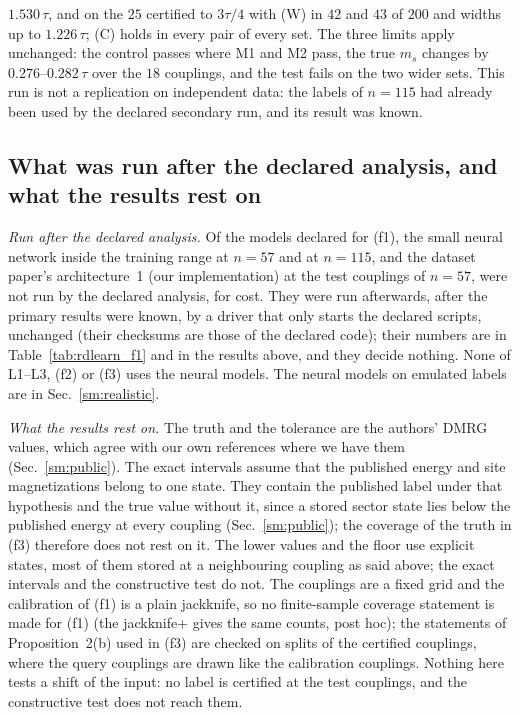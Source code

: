 \documentclass[aps,prx,onecolumn,10pt,nofootinbib,longbibliography,floatfix]{revtex4-2}
\theoremstyle{remark}
\newcommand{\ms}{m_s}
\begin{document}
$1.530\,\tau$, and on the $25$ certified to $3\tau/4$ with (W) in $42$ and $43$ of $200$ and widths up to %
$1.226\,\tau$; (C) holds in every pair of every set. The three limits apply unchanged: the control passes where %
M1 and M2 pass, the true $\ms$ changes by $0.276$--$0.282\,\tau$ over the $18$ couplings, and the test fails on the %
two wider sets. This run is not a replication on independent data: the labels of $n=115$ had already been used by %
the declared secondary run, and its result was known.

\subsection{What was run after the declared analysis, and what the results rest on}

\emph{Run after the declared analysis.} Of the models declared for (f1), the small neural network inside the
training range at $n=57$ and at $n=115$, and the dataset paper's architecture~1 (our implementation) at the test %
couplings of $n=57$, were not run by the declared analysis, for cost. They were run %
afterwards, after the primary results were known, by a driver that only starts the declared scripts, unchanged
(their checksums are those of the declared code); their numbers are in Table~\ref{tab:rdlearn_f1} and in the
results above, and they decide nothing. None of L1--L3, (f2) or (f3) uses
the neural models. The neural models on emulated labels are in Sec.~\ref{sm:realistic}.

\emph{What the results rest on.} The truth and the tolerance are the authors' DMRG values, which agree with our own
references where we have them (Sec.~\ref{sm:public}). The exact intervals assume that the published energy and site
magnetizations belong to one state. They contain the published label under that hypothesis and the true value
without it, since a stored sector state lies below the published energy at every coupling (Sec.~\ref{sm:public});
the coverage of the truth in (f3) therefore does not rest on it. The lower values and the floor use explicit states, most of them stored at a
neighbouring coupling as said above; the exact intervals and the constructive test do not. The couplings are a
fixed grid and the calibration of (f1) is a plain jackknife, so no finite-sample coverage statement is made for
(f1) (the jackknife+ gives the same counts, post hoc); the statements of Proposition~2(b) used in (f3) are checked on splits of the certified couplings, where the %
query couplings are drawn like the calibration couplings. Nothing here tests a shift of the input: no label is
certified at the test couplings, and the constructive test does not reach them.

\end{document}
